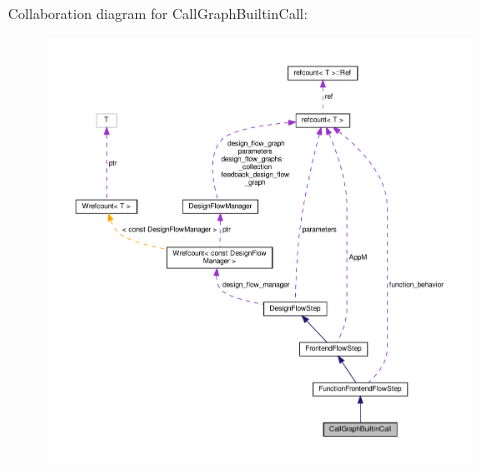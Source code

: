 Collaboration diagram for Call\+Graph\+Builtin\+Call\+:
\nopagebreak
\begin{figure}[H]
\begin{center}
\leavevmode
\includegraphics[width=350pt]{d3/d3d/classCallGraphBuiltinCall__coll__graph}
\end{center}
\end{figure}
